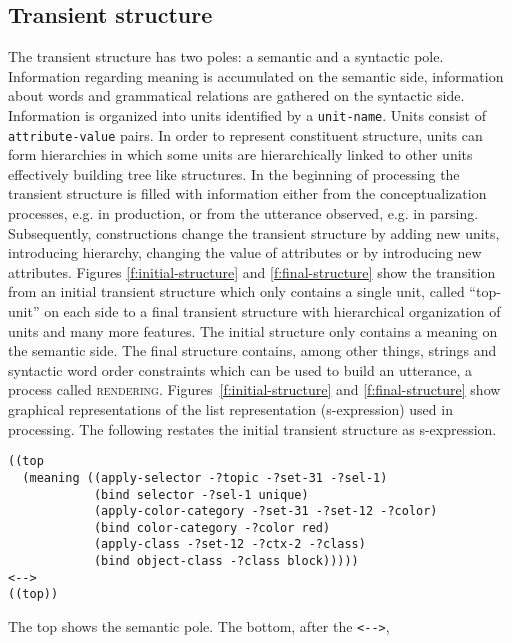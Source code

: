\subsection{Transient structure}
The transient structure has two poles: a semantic and a syntactic pole.
Information regarding meaning is accumulated on the semantic
side, information about words and grammatical relations are
gathered on the syntactic side. Information is organized into 
units identified by a {\footnotesize\tt unit-name}. Units consist of {\footnotesize\tt attribute-value} pairs. 
In order to represent constituent structure, units can form hierarchies 
in which some units are hierarchically linked to other units effectively 
building tree like structures.
In the beginning of processing the transient structure is filled with 
information either from the conceptualization 
processes, e.g. in production, or from the utterance observed, e.g.
in parsing. Subsequently, constructions change the transient structure by adding new
units, introducing hierarchy, changing the value of attributes or by introducing 
new attributes. Figures \ref{f:initial-structure} and \ref{f:final-structure} show the transition from 
an initial transient structure which only contains a single unit, called ``top-unit'' 
on each side to a final transient structure with hierarchical organization of units 
and many more features. The initial structure only contains a 
meaning on the semantic side. The final structure contains,
among other things, strings and syntactic word order constraints 
which can be used to build an utterance, a process called \textsc{rendering}.
Figures~\ref{f:initial-structure} and \ref{f:final-structure} show graphical representations
of the list representation (s-expression) used in processing. The
following restates the initial transient structure as s-expression.
\begin{lstlisting}
((top
  (meaning ((apply-selector -?topic -?set-31 -?sel-1)
            (bind selector -?sel-1 unique)
            (apply-color-category -?set-31 -?set-12 -?color)
            (bind color-category -?color red)
            (apply-class -?set-12 -?ctx-2 -?class)
            (bind object-class -?class block)))))
<-->
((top))
\end{lstlisting}
The top shows the semantic pole. The bottom, after the {\footnotesize\verb|<-->|},
